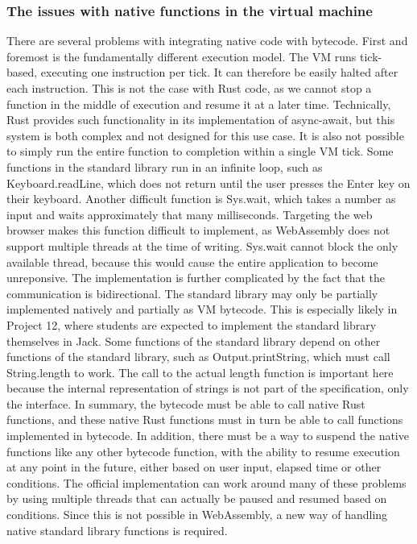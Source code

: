 \subsubsection{The issues with native functions in the virtual machine}
There are several problems with integrating native code with bytecode.
First and foremost is the fundamentally different execution model. The VM runs tick-based, executing one instruction per tick. It can therefore be easily halted after each instruction.
This is not the case with Rust code, as we cannot stop a function in the middle of execution and resume it at a later time.
Technically, Rust provides such functionality in its implementation of async-await, but this system is both complex and not designed for this use case.
It is also not possible to simply run the entire function to completion within a single VM tick. Some functions in the standard library run in an infinite loop, such as Keyboard.readLine, which does not return until the user presses the Enter key on their keyboard.
Another difficult function is Sys.wait, which takes a number as input and waits approximately that many milliseconds.
Targeting the web browser makes this function difficult to implement, as WebAssembly does not support multiple threads at the time of writing. Sys.wait cannot block the only available thread, because this would cause the entire application to become unreponsive.
The implementation is further complicated by the fact that the communication is bidirectional. The standard library may only be partially implemented natively and partially as VM bytecode. This is especially likely in Project 12, where students are expected to implement the standard library themselves in Jack.
Some functions of the standard library depend on other functions of the standard library, such as Output.printString, which must call String.length to work. The call to the actual length function is important here because the internal representation of strings is not part of the specification, only the interface.
In summary, the bytecode must be able to call native Rust functions, and these native Rust functions must in turn be able to call functions implemented in bytecode. In addition, there must be a way to suspend the native functions like any other bytecode function, with the ability to resume execution at any point in the future, either based on user input, elapsed time or other conditions.
The official implementation can work around many of these problems by using multiple threads that can actually be paused and resumed based on conditions.
Since this is not possible in WebAssembly, a new way of handling native standard library functions is required.

